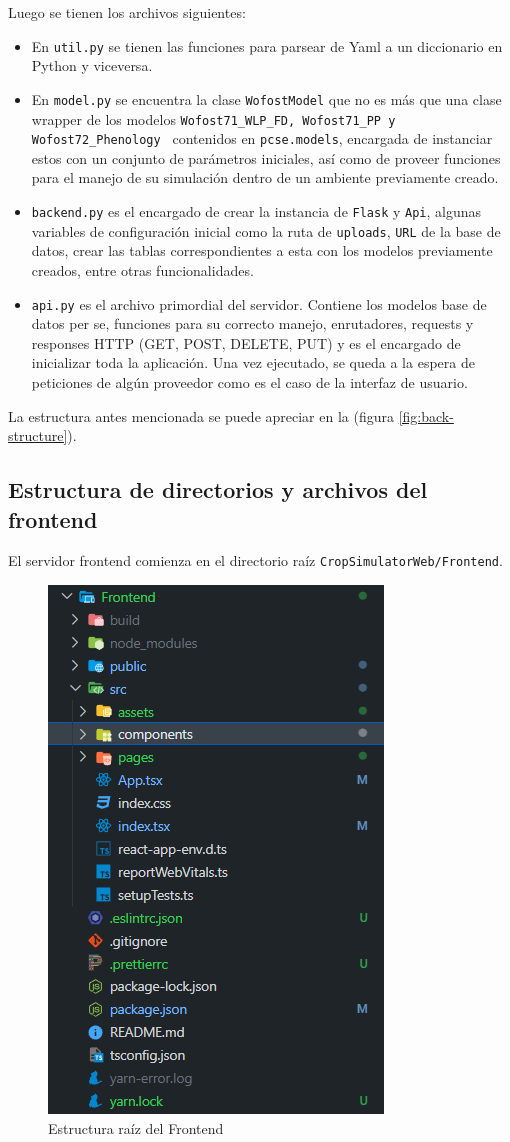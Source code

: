 Luego se tienen los archivos siguientes:
\begin{itemize}
	\item En \lstinline|util.py| se tienen las funciones para parsear de Yaml a un diccionario en Python y viceversa.
	\item En \lstinline|model.py| se encuentra la clase \lstinline|WofostModel| que no es más que una clase wrapper de los modelos \lstinline|Wofost71_WLP_FD, Wofost71_PP y Wofost72_Phenology | contenidos en \lstinline|pcse.models|, encargada de instanciar estos con un conjunto de parámetros iniciales, así como de proveer funciones para el manejo de su simulación dentro de un ambiente previamente creado.
	\item \lstinline|backend.py| es el encargado de crear la instancia de \lstinline|Flask| y \lstinline|Api|, algunas variables de configuración inicial como la ruta de \lstinline|uploads|, \lstinline|URL| de la base de datos, crear las tablas correspondientes a esta con los modelos previamente creados, entre otras funcionalidades.
	\item \lstinline|api.py| es el archivo primordial del servidor. Contiene los modelos base de datos per se, funciones para su correcto manejo, enrutadores, requests y responses HTTP (GET, POST, DELETE, PUT) y es el encargado de inicializar toda la aplicación. Una vez ejecutado, se queda a la espera de peticiones de algún proveedor como es el caso de la interfaz de usuario.
\end{itemize}

La estructura antes mencionada se puede apreciar en la (figura \ref{fig:back-structure}). 

\subsection{Estructura de directorios y archivos del frontend}
El servidor frontend comienza en el directorio raíz \lstinline|CropSimulatorWeb/Frontend|.

\begin{figure}[!h]
	\centering
	\includegraphics[width=0.4\linewidth]{Images/front-structure-root}
	\caption{Estructura raíz del Frontend}
	\label{fig:front-structure-root}
\end{figure}

